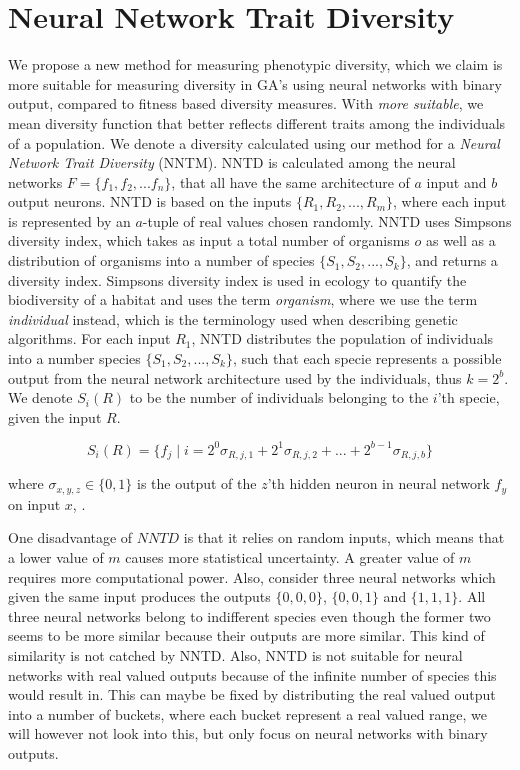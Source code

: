 \section{Neural Network Trait Diversity}
We propose a new method for measuring phenotypic diversity, which we claim is more suitable for measuring diversity in GA's using neural networks with binary output, compared to fitness based diversity measures. With \emph{more suitable}, we mean diversity function that better reflects different traits among the individuals of a population. 
We denote a diversity calculated using our method for a \emph{Neural Network Trait Diversity} (NNTM).
NNTD is calculated among the neural networks $F = \{f_1, f_2, ... f_n\}$, that all have the same architecture of $a$ input and $b$ output neurons. NNTD is based on the inputs $\{R_1, R_2, ..., R_m\}$, where each input is represented by an $a$-tuple of real values chosen randomly. NNTD uses Simpsons diversity index, which takes as input a total number of organisms $o$ as well as a distribution of organisms into a number of species $\{S_1, S_2, ..., S_k\}$, and returns a diversity index. Simpsons diversity index is used in ecology to quantify the biodiversity of a habitat and uses the term \emph{organism}, where we use the term \emph{individual} instead, which is the terminology used when describing genetic algorithms. 
For each input $R_1$, NNTD distributes the population of individuals into a number species $\{S_1, S_2, ..., S_k\}$, such that  each specie represents a possible output from the neural network architecture used by the individuals, thus $k = 2^b$. We denote $S_i(R)$ to be the number of individuals belonging to the $i$'th specie, given the input $R$.

\[S_i(R) = \{f_j \; | \; i = 2^0\sigma_{R,j,1} + 2^1\sigma_{R,j,2} + ... + 2^{b-1}\sigma_{R,j,b} \}\]

where $\sigma_{x,y,z} \in \{0, 1\}$ is the output of the $z$'th hidden neuron in neural network $f_y$ on input $x$, .

One disadvantage of $NNTD$ is that it relies on random inputs, which means that a lower value of $m$ causes more statistical uncertainty. A greater value of $m$ requires more computational power. Also, consider three neural networks which given the same input produces the outputs $\{0, 0, 0\}$, $\{0, 0, 1\}$ and $\{1, 1, 1\}$. All three neural networks belong to indifferent species even though the former two seems to be more similar because their outputs are more similar. This kind of similarity is not catched by NNTD. Also, NNTD is not suitable for neural networks with real valued outputs because of the infinite number of species this would result in. This can maybe be fixed by distributing the real valued output into a number of buckets, where each bucket represent a real valued range, we will however not look into this, but only focus on neural networks with binary outputs.
